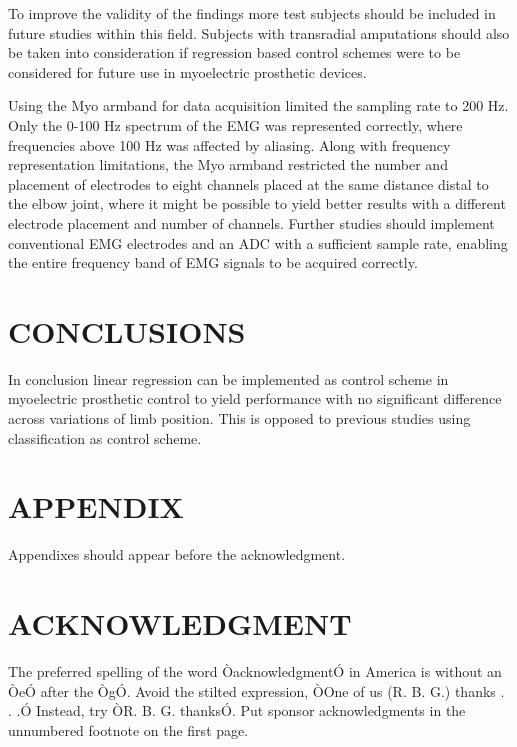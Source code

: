 \begin{multicols}{2}
To improve the validity of the findings more test subjects should be included in future studies within this field. Subjects with transradial amputations should also be taken into consideration if regression based control schemes were to be considered for future use in myoelectric prosthetic devices. 

Using the Myo armband for data acquisition limited the sampling rate to 200 Hz. Only the 0-100 Hz spectrum of the EMG was represented correctly, where frequencies above 100 Hz was affected by aliasing. Along with frequency representation limitations, the Myo armband restricted the number and placement of electrodes to eight channels placed at the same distance distal to the elbow joint, where it might be possible to yield better results with a different electrode placement and number of channels. Further studies should implement conventional EMG electrodes and an ADC with a sufficient sample rate, enabling the entire frequency band of EMG signals to be acquired correctly.		
	
\section*{CONCLUSIONS}%
	
% 		
In conclusion linear regression can be implemented as control scheme in myoelectric prosthetic control to yield performance with no significant difference across variations of limb position. This is opposed to previous studies using classification as control scheme.
 		
	
	
	
	
	
	
	
	\section*{APPENDIX}
	
	Appendixes should appear before the acknowledgment.
	
	\section*{ACKNOWLEDGMENT}
	
	The preferred spelling of the word ÒacknowledgmentÓ in America is without an ÒeÓ after the ÒgÓ. Avoid the stilted expression, ÒOne of us (R. B. G.) thanks . . .Ó  Instead, try ÒR. B. G. thanksÓ. Put sponsor acknowledgments in the unnumbered footnote on the first page.
	
\end{multicols}
	

